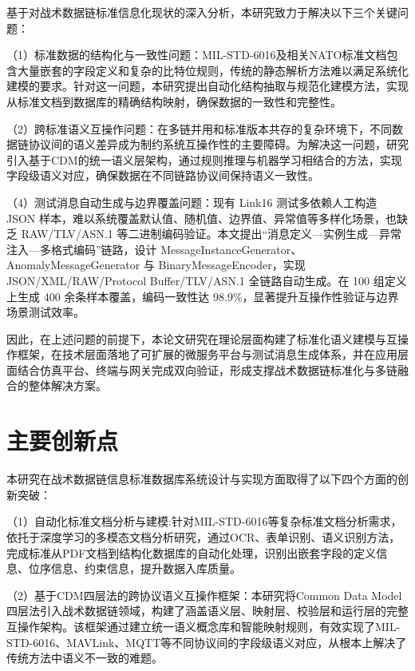 基于对战术数据链标准信息化现状的深入分析，本研究致力于解决以下三个关键问题：

（1）标准数据的结构化与一致性问题：MIL-STD-6016及相关NATO标准文档包含大量嵌套的字段定义和复杂的比特位规则，传统的静态解析方法难以满足系统化建模的要求\cite{MIL_STD_6016_Active_2024,SISO_STD_002_2006}。针对这一问题，本研究提出自动化结构抽取与规范化建模方法，实现从标准文档到数据库的精确结构映射，确保数据的一致性和完整性。

（2）跨标准语义互操作问题：在多链并用和标准版本共存的复杂环境下，不同数据链协议间的语义差异成为制约系统互操作性的主要障碍\cite{Hamdan2023Reference,MITRE_Link16_Interoperability_2024}。为解决这一问题，研究引入基于CDM的统一语义层架构，通过规则推理与机器学习相结合的方法，实现字段级语义对应，确保数据在不同链路协议间保持语义一致性。

（4）测试消息自动生成与边界覆盖问题：现有 Link16 测试多依赖人工构造 JSON 样本，难以系统覆盖默认值、随机值、边界值、异常值等多样化场景，也缺乏 RAW/TLV/ASN.1 等二进制编码验证。本文提出“消息定义—实例生成—异常注入—多格式编码”链路，设计 MessageInstanceGenerator、AnomalyMessageGenerator 与 BinaryMessageEncoder，实现 JSON/XML/RAW/Protocol Buffer/TLV/ASN.1 全链路自动生成。在 100 组定义上生成 400 余条样本覆盖，编码一致性达 98.9\%，显著提升互操作性验证与边界场景测试效率。

因此，在上述问题的前提下，本论文研究在理论层面构建了标准化语义建模与互操作框架，在技术层面落地了可扩展的微服务平台与测试消息生成体系，并在应用层面结合仿真平台、终端与网关完成双向验证\cite{SAIC_JRE_Overview_2021,CurtissWright_TCG_HUNTR_2020,DOTE_2022_MIDS_LVT}，形成支撑战术数据链标准化与多链融合的整体解决方案。

\section{主要创新点}

本研究在战术数据链信息标准数据库系统设计与实现方面取得了以下四个方面的创新突破：

（1）自动化标准文档分析与建模:针对MIL-STD-6016等复杂标准文档分析需求，依托于深度学习的多模态文档分析研究，通过OCR、表单识别、语义识别方法，完成标准从PDF文档到结构化数据库的自动化处理，识别出嵌套字段的定义信息、位序信息、约束信息，提升数据入库质量。

（2）基于CDM四层法的跨协议语义互操作框架：本研究将Common Data Model四层法引入战术数据链领域，构建了涵盖语义层、映射层、校验层和运行层的完整互操作架构。该框架通过建立统一语义概念库和智能映射规则，有效实现了MIL-STD-6016、MAVLink、MQTT等不同协议间的字段级语义对应，从根本上解决了传统方法中语义不一致的难题。

